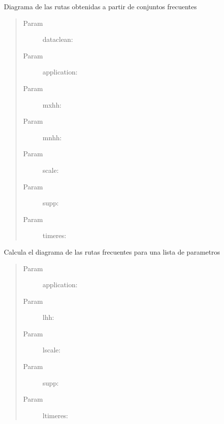 \documentclass[letterpaper,10pt,english]{sphinxmanual}
\begin{document}
\begin{fulllineitems}
\label{index:SuperHubProcessing.transactionRoutes}
Diagrama de las rutas obtenidas a partir de conjuntos frecuentes
\begin{quote}\begin{description}
\item[{Param }] \leavevmode
dataclean:

\item[{Param }] \leavevmode
application:

\item[{Param }] \leavevmode
mxhh:

\item[{Param }] \leavevmode
mnhh:

\item[{Param }] \leavevmode
scale:

\item[{Param }] \leavevmode
supp:

\item[{Param }] \leavevmode
timeres:

\end{description}\end{quote}

\end{fulllineitems}


\begin{fulllineitems}
\label{index:SuperHubProcessing.transactionRoutesMany}
Calcula el diagrama de las rutas frecuentes para una lista de parametros
\begin{quote}\begin{description}
\item[{Param }] \leavevmode
application:

\item[{Param }] \leavevmode
lhh:

\item[{Param }] \leavevmode
lscale:

\item[{Param }] \leavevmode
supp:

\item[{Param }] \leavevmode
ltimeres:

\end{description}\end{quote}

\end{fulllineitems}
\end{document}
